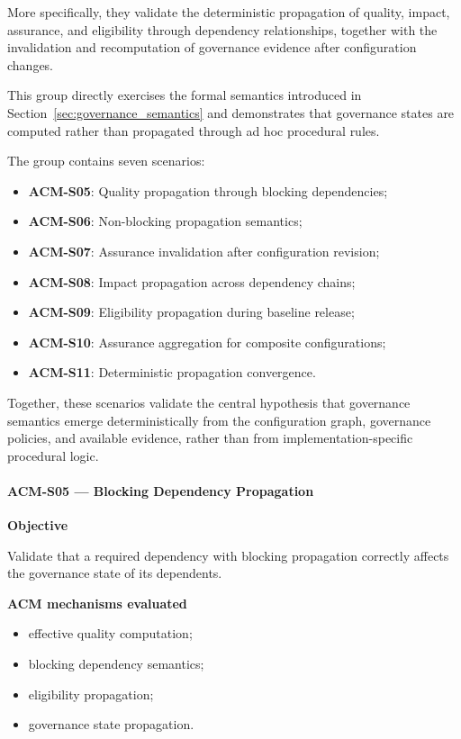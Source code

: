 \documentclass[10pt]{article}
\begin{document}
More specifically, they validate the deterministic propagation of quality,
impact, assurance, and eligibility through dependency relationships, together
with the invalidation and recomputation of governance evidence after
configuration changes.

This group directly exercises the formal semantics introduced in
Section~\ref{sec:governance_semantics} and demonstrates that governance states
are computed rather than propagated through ad hoc procedural rules.

The group contains seven scenarios:

\begin{itemize}
    \item \textbf{ACM-S05}: Quality propagation through blocking dependencies;
    \item \textbf{ACM-S06}: Non-blocking propagation semantics;
    \item \textbf{ACM-S07}: Assurance invalidation after configuration revision;
    \item \textbf{ACM-S08}: Impact propagation across dependency chains;
    \item \textbf{ACM-S09}: Eligibility propagation during baseline release;
    \item \textbf{ACM-S10}: Assurance aggregation for composite configurations;
    \item \textbf{ACM-S11}: Deterministic propagation convergence.
\end{itemize}

Together, these scenarios validate the central hypothesis that governance
semantics emerge deterministically from the configuration graph, governance
policies, and available evidence, rather than from implementation-specific
procedural logic.

\paragraph{ACM-S05 --- Blocking Dependency Propagation}

\textbf{Objective}

Validate that a required dependency with blocking propagation correctly affects
the governance state of its dependents.

\textbf{ACM mechanisms evaluated}

\begin{itemize}
    \item effective quality computation;
    \item blocking dependency semantics;
    \item eligibility propagation;
    \item governance state propagation.
\end{itemize}
\end{document}
